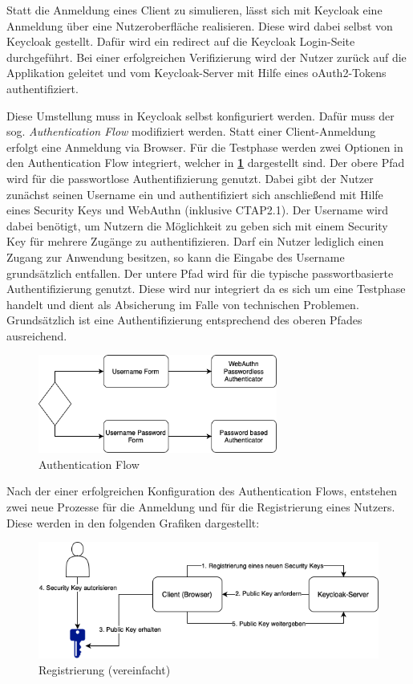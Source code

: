 Statt die Anmeldung eines Client zu simulieren, lässt sich mit  Keycloak eine Anmeldung über eine Nutzeroberfläche realisieren. Diese wird dabei selbst von Keycloak gestellt. Dafür wird ein redirect auf die Keycloak Login-Seite durchgeführt. Bei einer erfolgreichen Verifizierung wird der Nutzer zurück auf die Applikation geleitet und vom Keycloak-Server mit Hilfe eines oAuth2-Tokens authentifiziert. 

Diese Umstellung muss in Keycloak selbst konfiguriert werden. Dafür muss der sog. \textit{Authentication Flow} modifiziert werden. Statt einer Client-Anmeldung erfolgt eine Anmeldung via Browser. Für die Testphase werden zwei Optionen in den Authentication Flow integriert, welcher in \textbf{\ref{auth-flow}} dargestellt sind. Der obere Pfad wird für die passwortlose Authentifizierung genutzt. Dabei gibt der Nutzer zunächst seinen Username ein und authentifiziert sich anschließend mit Hilfe eines Security Keys und WebAuthn (inklusive CTAP2.1). Der Username wird dabei benötigt, um Nutzern die Möglichkeit zu geben sich mit einem Security Key für mehrere Zugänge zu authentifizieren. Darf ein Nutzer lediglich einen Zugang zur Anwendung besitzen, so kann die Eingabe des Username grundsätzlich entfallen. Der untere Pfad wird für die typische passwortbasierte Authentifizierung genutzt. Diese wird nur integriert da es sich um eine Testphase handelt und dient als Absicherung im Falle von technischen Problemen. Grundsätzlich ist eine Authentifizierung entsprechend des oberen Pfades ausreichend.

\begin{figure}[H]
	\centering 
	\includegraphics[width=0.7\textwidth]{img/abbildungen/authentication_flow.png}
	\captionsetup{format=hang}
	\caption{Authentication Flow} \label{auth-flow}
\end{figure}

Nach der einer erfolgreichen Konfiguration des Authentication Flows, entstehen zwei neue Prozesse für die Anmeldung und für die Registrierung eines Nutzers. Diese werden in den folgenden Grafiken dargestellt:

\begin{figure}[H]
	\centering 
	\includegraphics[width=1\textwidth]{img/abbildungen/register_simplified.png}
	\captionsetup{format=hang}
	\caption{Registrierung (vereinfacht)}
\end{figure}

